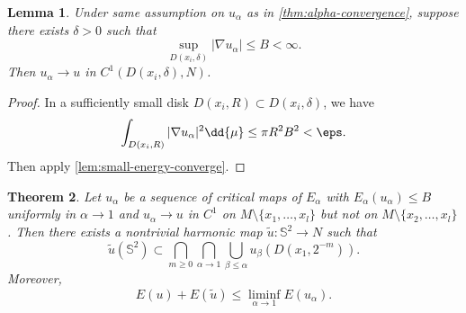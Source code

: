 \documentclass[UTF8,12pt]{article}
\theoremstyle{plain}\newtheorem{theorem}{Theorem}
\theoremstyle{definition}\newtheorem{definition}[theorem]{Definition}
\theoremstyle{definition}\newtheorem{example}[theorem]{Example}
\theoremstyle{plain}\newtheorem{axiom}[theorem]{Axiom}
\theoremstyle{plain}\newtheorem{assertion}[theorem]{Assertion}
\theoremstyle{plain}\newtheorem{corollary}[theorem]{Corollary}
\theoremstyle{plain}\newtheorem{lemma}[theorem]{Lemma}
\theoremstyle{plain}\newtheorem{proposition}[theorem]{Proposition}
\theoremstyle{plain}\newtheorem{prop}[theorem]{Proposition}
\theoremstyle{plain}\newtheorem{conjecture}[theorem]{Conjecture}
\theoremstyle{plain}\newtheorem{conj}[theorem]{Conjecture}
\theoremstyle{plain}\newtheorem{problem}[theorem]{Problem}
\theoremstyle{remark}\newtheorem{notation}[theorem]{Notation}
\theoremstyle{definition}\newtheorem*{question}{Question}
\theoremstyle{definition}\newtheorem*{answer}{Answer}
\theoremstyle{definition}\newtheorem*{goal}{Goal}
\theoremstyle{plain}\newtheorem*{application}{Application}
\theoremstyle{plain}\newtheorem*{exercise}{Exercise}
\theoremstyle{remark}\newtheorem*{remark}{Remark}
\theoremstyle{remark}\newtheorem*{note}{\small{Note}}
\numberwithin{equation}{section}
\numberwithin{theorem}{section}
\numberwithin{figure}{section}
\begin{document}
\begin{lemma}\label{lem:bounded-du-converge}
    Under same assumption on \(u_\alpha\) as in \cref{thm:alpha-convergence}, suppose
    there exists \(\delta>0\) such that  \[
        \sup_{D(x_i,\delta)}|\nabla u_\alpha|\le B<\infty
    .\] Then \(u_\alpha\to u\) in \(C^1(D(x_i,\delta),N)\).
\end{lemma}
\begin{proof}
    In a sufficiently small disk \(D(x_i,R)\subset D(x_i,\delta)\), we have \[
        \int_{D(x_i,R)}|\nabla u_\alpha|^2\dd{\mu}\le \pi R^2B^2<\eps
    .\] Then apply \cref{lem:small-energy-converge}.
\end{proof}

\begin{theorem}\label{thm:energy-loss}
    Let \(u_\alpha\) be a sequence of critical maps of \(E_\alpha\) with \(E_\alpha(
    u_\alpha)\le B\) uniformly in \(\alpha\to 1\) and \(u_\alpha\to u\) in \(C^1\) on
    \(M\setminus\{x_1,\ldots,x_l\}\) but not on \(M\setminus\{x_2,\ldots,x_l\}\).
    Then there exists a nontrivial harmonic map \(\tilde{u}\colon \mathbb{S}^2\to N\)
    such that \[
        \tilde{u}(\mathbb{S}^2)\subset \bigcap_{m\ge 0}\bigcap_{\alpha\to 1}
        \bigcup_{\beta\le \alpha}u_\beta(D(x_1,2^{-m}))
    .\] Moreover, \[
        E(u)+E(\tilde{u})\le \liminf_{\alpha\to 1}E(u_\alpha)
    .\] 
\end{theorem}
\end{document}
